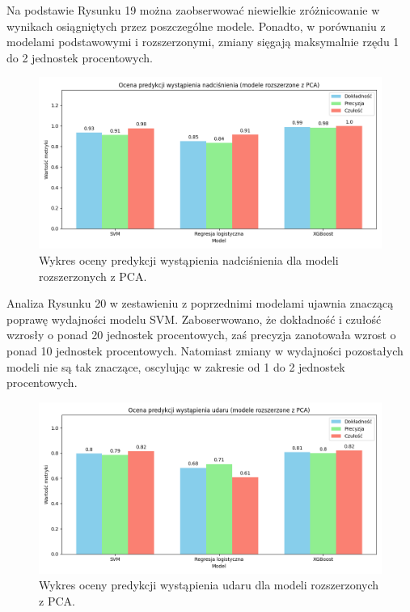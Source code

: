 \documentclass[onecolumn,12pt]{article}
\begin{document}
\noindent
Na podstawie Rysunku 19 można zaobserwować niewielkie zróżnicowanie w wynikach osiągniętych przez poszczególne modele. Ponadto, w porównaniu z modelami podstawowymi i rozszerzonymi, zmiany sięgają maksymalnie rzędu 1 do 2 jednostek procentowych. 

\begin{figure}[H]
    \centering
    \includegraphics[width=0.86\linewidth]{raport/graphs/nadcisnienie_pca.png}
    \captionsetup{justification=centering}
    \caption{Wykres oceny predykcji wystąpienia nadciśnienia dla modeli rozszerzonych z PCA.}
\end{figure}

\noindent
Analiza Rysunku 20 w zestawieniu z poprzednimi modelami ujawnia znaczącą poprawę wydajności modelu SVM. Zaboserwowano, że dokładność i czułość wzrosły o ponad 20 jednostek procentowych, zaś precyzja zanotowała wzrost o ponad 10 jednostek procentowych. Natomiast zmiany w wydajności pozostałych modeli nie są tak znaczące, oscylując w zakresie od 1 do 2 jednostek procentowych. 

\begin{figure}[H]
    \centering
    \includegraphics[width=0.90\linewidth]{raport/graphs/udar_pca.png}
    \captionsetup{justification=centering}
    \caption{Wykres oceny predykcji wystąpienia udaru dla modeli rozszerzonych z PCA.}
\end{figure}
\end{document}
